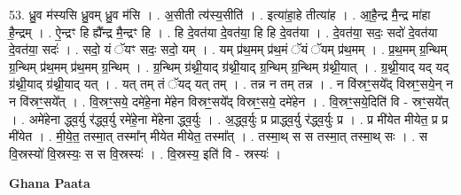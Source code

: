 \documentclass[17pt]{extarticle}
\begin{document}
53. ध्रु॒व म॑स्यसि ध्रु॒वम् ध्रु॒व म॑सि । . अ॒सीती त्य॑स्य॒सीति॑ । . इत्या॑हा॒हे तीत्या॑ह । . आ॒है॒न्द्र मै॒न्द्र मा॑हा है॒न्द्रम् । . ऐ॒न्द्रꣳ हि ह्यै᳚न्द्र मै॒न्द्रꣳ हि । . हि दे॒वत॑या दे॒वत॑या॒ हि हि दे॒वत॑या । . दे॒वत॑या॒ सदः॒ सदो॑ दे॒वत॑या दे॒वत॑या॒ सदः॑ । . सदो॒ यं ॅयꣳ सदः॒ सदो॒ यम् । . यम् प्र॑थ॒मम् प्र॑थ॒मं ॅयं ॅयम् प्र॑थ॒मम् । . प्र॒थ॒मम् ग्र॒न्थिम् ग्र॒न्थिम् प्र॑थ॒मम् प्र॑थ॒मम् ग्र॒न्थिम् । . ग्र॒न्थिम् ग्र॑थ्नी॒याद् ग्र॑थ्नी॒याद् ग्र॒न्थिम् ग्र॒न्थिम् ग्र॑थ्नी॒यात् । . ग्र॒थ्नी॒याद् यद् यद् ग्र॑थ्नी॒याद् ग्र॑थ्नी॒याद् यत् । . यत् तम् तं ॅयद् यत् तम् । . तन्न न तम् तन्न । . न वि॑स्रꣳ॒॒सये᳚द् विस्रꣳ॒॒सये॒न् न न वि॑स्रꣳ॒॒सये᳚त् । . वि॒स्रꣳ॒॒सये॒ दमे॑हे॒ना मे॑हेन विस्रꣳ॒॒सये᳚द् विस्रꣳ॒॒सये॒ दमे॑हेन । . वि॒स्रꣳ॒॒सये॒दिति॑ वि - स्रꣳ॒॒सये᳚त् । . अमे॑हेना द्ध्व॒र्यु र॑द्ध्व॒र्यु रमे॑हे॒ना मे॑हेना द्ध्व॒र्युः । . अ॒द्ध्व॒र्युः प्र प्राद्ध्व॒र्यु र॑द्ध्व॒र्युः प्र । . प्र मी॑येत मीयेत॒ प्र प्र मी॑येत । . मी॒ये॒त॒ तस्मा॒त् तस्मा᳚न् मीयेत मीयेत॒ तस्मा᳚त् । . तस्मा॒थ् स स तस्मा॒त् तस्मा॒थ् सः । . स वि॒स्रस्यो॑ वि॒स्रस्यः॒ स स वि॒स्रस्यः॑ । . वि॒स्रस्य॒ इति॑ वि - स्रस्यः॑ । \newline

\textbf{Ghana Paata } \newline
\end{document}
